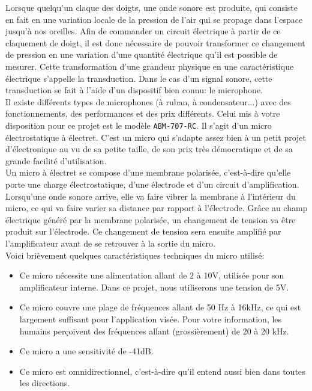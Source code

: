 
Lorsque quelqu'un claque des doigts, une onde sonore est produite, qui consiste en fait en une variation locale de la pression de l'air qui se propage dans l'espace jusqu'à nos oreilles. Afin de commander un circuit électrique à partir de ce claquement de doigt, il est donc nécessaire de pouvoir transformer ce changement de pression en une variation d'une quantité électrique qu'il est possible de mesurer. Cette transformation d'une grandeur physique en une caractéristique électrique s'appelle la transduction. Dans le cas d'un signal sonore, cette transduction se fait à l'aide d'un dispositif bien connu: le microphone. \\

Il existe différents types de microphones (à ruban, à condensateur...) avec des fonctionnements, des performances et des prix différents. Celui mis à votre disposition pour ce projet est le modèle \texttt{ABM-707-RC}. Il s'agit d'un micro électrostatique à électret. C'est un micro qui s'adapte assez bien à un petit projet d'électronique au vu de sa petite taille, de son prix très démocratique et de sa grande facilité d'utilisation. \\

Un micro à électret se compose d'une membrane polarisée, c'est-à-dire qu'elle porte une charge électrostatique, d'une électrode et d'un circuit d'amplification. Lorsqu'une onde sonore arrive, elle va faire vibrer la membrane à l'intérieur du micro, ce qui va faire varier sa distance par rapport à l'électrode. Grâce au champ électrique généré par la membrane polarisée, un changement de tension va être produit sur l'électrode. Ce changement de tension sera ensuite amplifié par l'amplificateur avant de se retrouver à la sortie du micro.\\

Voici brièvement quelques caractéristiques techniques du micro utilisé:
\begin{itemize}
\item Ce micro nécessite une alimentation allant de 2 à 10V, utilisée pour son amplificateur interne. Dans ce projet, nous utiliserons une tension de 5V.
\item Ce micro couvre une plage de fréquences allant de 50 Hz à 16kHz, ce qui est largement suffisant pour l'application visée. Pour votre information, les humains perçoivent des fréquences allant (grossièrement) de 20 à 20 kHz.
\item Ce micro a une sensitivité de -41dB.
\item Ce micro est omnidirectionnel, c'est-à-dire qu'il entend aussi bien dans toutes les directions.
\end{itemize}

